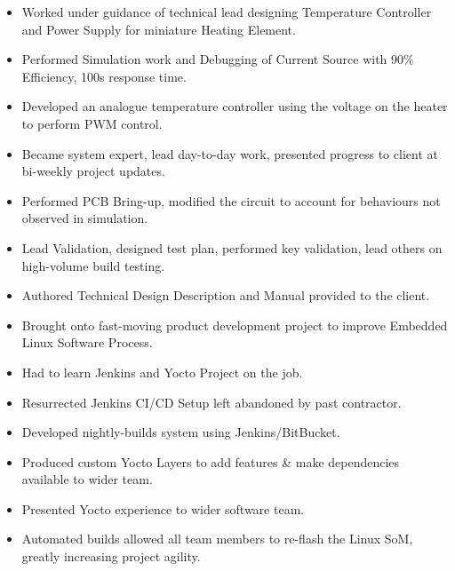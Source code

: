 {
  {\begin{itemize}
    \item Worked under guidance of technical lead designing Temperature Controller and Power Supply for miniature Heating Element. 
    \item Performed Simulation work and Debugging of Current Source with 90\% Efficiency, 100\mu s response time. 
    \item Developed an analogue temperature controller using the voltage on the heater to perform PWM control. 
    \item Became system expert, lead day-to-day work, presented progress to client at bi-weekly project updates.
    \item Performed PCB Bring-up, modified the circuit to account for behaviours not observed in simulation. 
    \item Lead Validation, designed test plan, performed key validation, lead others on high-volume build testing. 
    \item Authored Technical Design Description and Manual provided to the client. 
  \end{itemize} 
  }
}

{
  {\begin{itemize}
    \item Brought onto fast-moving product development project to improve Embedded Linux Software Process.
    \item Had to learn Jenkins and Yocto Project on the job. 
    \item Resurrected Jenkins CI/CD Setup left abandoned by past contractor. 
    \item Developed nightly-builds system using Jenkins/BitBucket.
    \item Produced custom Yocto Layers to add features \& make dependencies available to wider team. 
    \item Presented Yocto experience to wider software team. 
    \item Automated builds allowed all team members to re-flash the Linux SoM, greatly increasing project agility. 
  \end{itemize} 
  }
}

